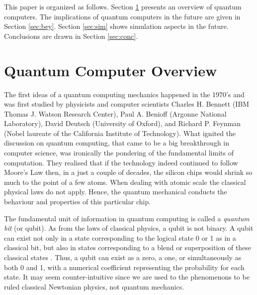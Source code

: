 \documentclass[twoside,11pt]{article}
\begin{document}
This paper is organized as follows.
Section \ref{sec:qc} presents an overview of quantum computers.
The implications of quantum computers in the future are given in Section \ref{sec:bey}.
Section \ref{sec:sim} shows simulation aspects in the future.
Conclusions are drawn in Section \ref{sec:conc}.

\section{Quantum Computer Overview}
\label{sec:qc}


The first ideas of a quantum computing mechanics happened in the 1970's and was first studied by physicists and computer scientists 
Charles H. Bennett (IBM Thomas J. Watson Research Center), 
Paul A. Benioff (Argonne National Laboratory),
David Deutsch (University of Oxford),
and Richard P. Feynman (Nobel laureate of the California Institute of Technology).
What ignited the discussion on quantum computing, that came to be a big breakthrough in computer science, was ironically the pondering of the fundamental limits of computation.
They realised that if  the technology indeed continued to follow Moore's Law then, in a just a couple of decades, the silicon chips would shrink so much to the point of a few atoms.
When dealing with atomic scale the classical physical laws do not apply.
Hence, the quantum mechanical conducts the behaviour and properties of this particular chip.



The fundamental unit of information in quantum computing is called a \emph{quantum bit} (or qubit).
As from the laws of classical physics, a qubit is not binary.
A qubit can exist not only in a state corresponding to the logical state 0 or 1 as in a classical bit, but also in states corresponding to a blend or superposition of these classical states \citep{thedg}.
Thus, a qubit can exist as a zero, a one, or simultaneously as both 0 and 1, with a numerical coefficient representing the probability for each state. 
It may seem counter-intuitive since we are used to the phenomenons to be ruled classical Newtonian physics, not quantum mechanics.
\end{document}
